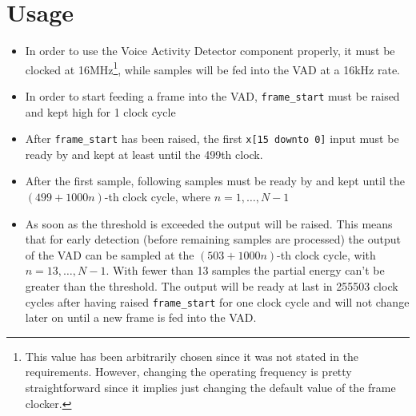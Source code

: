 \section{Usage}
\begin{itemize}
  \item In order to use the Voice Activity Detector component properly,
        it must be clocked at 16\si{\mega\hertz}\footnote{This value has been
        arbitrarily chosen since it was not stated in the requirements. However,
        changing the operating frequency is pretty straightforward since it implies
        just changing the default value of the frame clocker.}, while samples will be fed
        into the VAD at a 16\si{\kilo\hertz} rate.
  \item In order to start feeding a frame into the VAD,
        \texttt{frame\_start} must be raised and kept high for 1 clock cycle
  \item After \texttt{frame\_start} has been raised,
        the first \texttt{x[15 downto 0]} input must be ready by
        and kept at least until the 499th clock.
  \item After the first sample, following samples must be ready by
        and kept until the $(499 + 1000n)$-th clock cycle, where
        $n = 1, \dots, N - 1$
  \item As soon as the threshold is exceeded the output will be raised.
        This means that for early detection (before remaining samples are
        processed) the output of the VAD can be sampled at the
        $(503 + 1000n)$-th clock cycle, with $n = 13, \dots, N - 1$. With fewer
        than 13 samples the partial energy can't be greater than the threshold.
        The output will be ready at last in 255503 clock cycles after having
        raised \texttt{frame\_start} for one clock cycle and will not change
        later on until a new frame is fed into the VAD.
\end{itemize}
